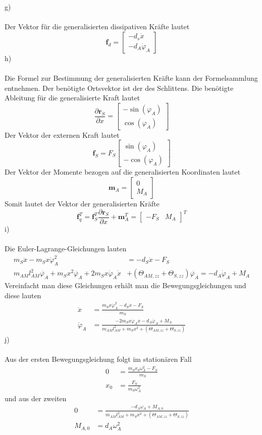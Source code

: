 g)\\ \\
Der Vektor für die generalisierten dissipativen Kräfte lautet
\[
	\textbf{f}_d = \begin{bmatrix}
		-d_s\dot{x} \\
		-d_A\dot{\varphi}_A
	\end{bmatrix}
\]
h)\\ \\
Die Formel zur Bestimmung der generalisierten Kräfte kann der Formelsammlung entnehmen. Der benötigte Ortsvektor ist der des Schlittens. Die benötigte Ableitung für die generalisierte Kraft lautet 
\[
	\frac{\partial \textbf{r}_S}{\partial x} = \begin{bmatrix}
		-\sin(\varphi_A) \\
		\cos(\varphi_A)
	\end{bmatrix}
\]
Der Vektor der externen Kraft lautet
\[
	\textbf{f}_S = F_S\begin{bmatrix}
		\sin(\varphi_A) \\
		-\cos(\varphi_A)
	\end{bmatrix}
\]
Der Vektor der Momente bezogen auf die generalisierten Koordinaten lautet
\[
	\textbf{m}_A = \begin{bmatrix}
		0 \\
		M_A
	\end{bmatrix}
\]
Somit lautet der Vektor der generalisierten Kräfte
\[
	\textbf{f}^T_q = \textbf{f}_S^T	\frac{\partial \textbf{r}_S}{\partial x} + \textbf{m}^T_A = \begin{bmatrix}
		-F_S & M_A
	\end{bmatrix}^T
\]
\newpage
\noindent
i)\\ \\
Die Euler-Lagrange-Gleichungen lauten
\begin{align*}
	m_S\ddot{x} - m_Sx\dot{\varphi}_A^2 &= -d_S\dot{x} - F_S \\
	m_{AM}l^2_{AM}\ddot{\varphi_A} + m_Sx^2\ddot{\varphi_A} + 2m_Sx\dot{\varphi}_A\dot{x} &+ (\varTheta_{AM,zz} + \varTheta_{S,zz})\ddot{\varphi_A} = -d_A\dot{\varphi}_A + M_A
\end{align*}
Vereinfacht man diese Gleichungen erhält man die Bewegungsgleichungen und diese lauten
\begin{align*}
	\ddot{x} &= \frac{m_Sx\dot{\varphi}^2_A - d_S\dot{x} - F_S}{m_S} \\
	\ddot{\varphi}_A &= \frac{-2m_Sx\dot{\varphi}_A\dot{x} - d_A\dot{\varphi}_A + M_A}{m_{AM}l^2_{AM} + m_Sx^2 + (\varTheta_{AM,zz} + \varTheta_{S,zz})}
\end{align*}
j)\\ \\
Aus der ersten Bewegungsgleichung folgt im stationären Fall
\begin{align*}
		0 &= \frac{m_Sx_0\omega^2_A - F_S}{m_S} \\
		x_0 &= \frac{F_S}{m_S\omega_A^2}
\end{align*}
und aus der zweiten
\begin{align*}
	0 &= \frac{ - d_A\omega_A + M_{A,0}}{m_{AM}l^2_{AM} + m_Sx^2 + (\varTheta_{AM,zz} + \varTheta_{S,zz})} \\
	M_{A,0} &= d_A\omega_A^2	
\end{align*}